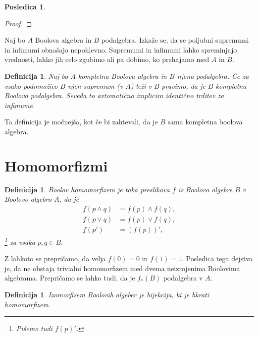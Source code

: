 \documentclass{amsart}
\newtheorem{posledica}[izrek]{Posledica}
\newtheorem{definicija}[izrek]{Definicija}
\begin{document}
\begin{posledica}
    
\end{posledica}

\begin{proof}
    
\end{proof}



Naj bo $A$ Boolova algebra in $B$ podalgebra.
Izkaže se, da se poljubni supremumi in infimumi obnašajo nepohlevno.
Supremumi in infimumi lahko spreminjajo vrednosti, lahko jih celo zgubimo ali pa dobimo,
ko prehajamo med $A$ in $B$.

\begin{definicija}
    Naj bo $A$ kompletna Boolova algebra in $B$ njena podalgebra.
    Če za vsako podmnožico $B$ njen supremum (v $A$) leži v $B$ pravimo, da je 
    $B$ kompletna Boolova podalgebra. Seveda to avtomatično implicira identično trditev za infimume.
\end{definicija}

Ta definicija je močnejša, kot če bi zahtevali, da je $B$ sama kompletna boolova algebra.


\section{Homomorfizmi}

\begin{definicija}
    Boolov homomorfizem je taka preslikava $f$ iz Boolova algebre $B$ v 
    Boolovo algebro $A$, da je 
    \begin{align*}
        f(p \wedge q) &= f(p) \wedge f(q),\\
        f(p \vee q) &= f(p) \vee f(q),\\
        f(p') &= (f(p))',
    \end{align*}\footnote{Pišemo tudi \(f(p)'\).}
    za vsaka \(p, q \in B.\)
\end{definicija}

Z lahkoto se prepričamo, da velja \(f(0) = 0\) in \(f(1) = 1\). Posledica tega dejstva je, da ne obstaja trivialni homomorfizem med dvema
neizrojenima Boolovima algebrama. Prepričamo se lahko tudi, da je \(f_{*}(B)\) podalgebra v \(A\).

\begin{definicija}
    Izomorfizem Boolovih algeber je bijekcija, ki je hkrati homomorfizem.
\end{definicija}
\end{document}
